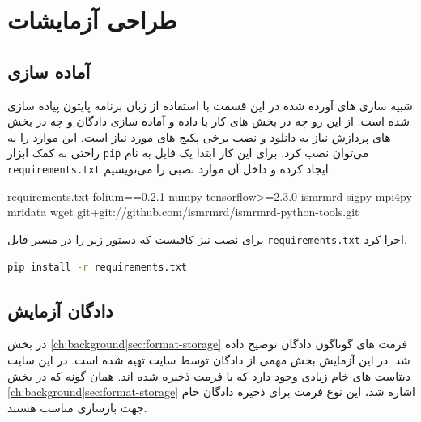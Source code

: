 \FloatBarrier
\chapter{طراحی آزمایشات}

\section{آماده سازی}
شبیه سازی های آورده شده در این قسمت با استفاده از زبان برنامه پایتون
پیاده سازی شده است. از این رو چه در بخش های کار با داده و آماده سازی دادگان و چه در بخش های پردازش نیاز به دانلود و نصب برخی پکیج های مورد نیاز است. این موارد را به راحتی به کمک ابزار \texttt{pip}
می‌توان نصب کرد. برای این کار ابتدا یک فایل به نام \texttt{requirements.txt}
ایجاد کرده و داخل آن موارد نصبی را می‌نویسیم.


\begin{latin}
\begin{wgetlisting}{requirements.txt}
folium==0.2.1
numpy
tensorflow>=2.3.0
ismrmrd
sigpy
mpi4py
mridata
wget
git+git://github.com/ismrmrd/ismrmrd-python-tools.git
\end{wgetlisting}
\end{latin}

برای نصب نیز کافیست که دستور زیر را در مسیر فایل \texttt{requirements.txt} اجرا کرد.

\begin{latin}%
\begin{lstlisting}[language=bash, frame=none, mathescape=true]
pip install -r requirements.txt 
\end{lstlisting}
\end{latin}









\section{دادگان آزمایش}
در بخش \ref{ch:background|sec:format-storage}
فرمت های گوناگون دادگان توضیح داده شد. در این آزمایش بخش مهمی از دادگان توسط سایت 
تهیه شده است. در این سایت دیتاست های خام زیادی وجود دارد که با فرمت 
ذخیره شده اند. همان گونه که در بخش \ref{ch:background|sec:format-storage} اشاره شد، این نوع فرمت برای ذخیره دادگان خام جهت بازسازی مناسب هستند. 




